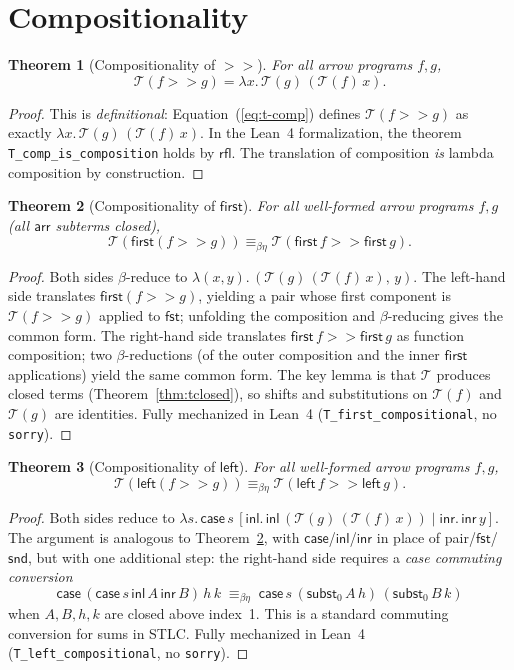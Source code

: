 \documentclass[11pt,a4paper]{article}
\newtheorem{theorem}{Theorem}
\theoremstyle{definition}
\theoremstyle{remark}
\newcommand{\comp}{\mathbin{>\!\!>}}
\newcommand{\first}{\mathsf{first}}
\newcommand{\leftc}{\mathsf{left}}
\newcommand{\T}{\mathcal{T}}
\newcommand{\beteta}{\equiv_{\beta\eta}}
\begin{document}
\section{Compositionality}\label{sec:compositionality}

\begin{theorem}[Compositionality of $\comp$]\label{thm:comp}
For all arrow programs $f, g$,
\[
  \T(f \comp g) = \lambda x.\, \T(g)\,(\T(f)\,x).
\]
\end{theorem}

\begin{proof}
This is \emph{definitional}: Equation~(\ref{eq:t-comp}) defines $\T(f \comp g)$ as
exactly $\lambda x.\, \T(g)\,(\T(f)\,x)$. In the Lean~4 formalization, the
theorem \texttt{T\_comp\_is\_composition} holds by $\mathsf{rfl}$. The
translation of composition \emph{is} lambda composition by construction.
\end{proof}

\begin{theorem}[Compositionality of $\first$]\label{thm:first}
For all well-formed arrow programs $f, g$ (all $\mathsf{arr}$ subterms
closed),
\[
  \T(\first(f \comp g)) \beteta \T(\first\,f \comp \first\,g).
\]
\end{theorem}

\begin{proof}
Both sides $\beta$-reduce to $\lambda(x, y).\, (\T(g)\,(\T(f)\,x),\, y)$.
The left-hand side translates $\first(f \comp g)$, yielding a pair whose
first component is $\T(f \comp g)$ applied to $\mathsf{fst}$; unfolding the
composition and $\beta$-reducing gives the common form. The right-hand side
translates $\first\,f \comp \first\,g$ as function composition; two
$\beta$-reductions (of the outer composition and the inner $\first$
applications) yield the same common form. The key lemma is that $\T$
produces closed terms (Theorem~\ref{thm:tclosed}), so shifts and
substitutions on $\T(f)$ and $\T(g)$ are identities. Fully mechanized in
Lean~4 (\texttt{T\_first\_compositional}, no \texttt{sorry}).
\end{proof}

\begin{theorem}[Compositionality of $\leftc$]\label{thm:left}
For all well-formed arrow programs $f, g$,
\[
  \T(\leftc(f \comp g)) \beteta \T(\leftc\,f \comp \leftc\,g).
\]
\end{theorem}

\begin{proof}
Both sides reduce to
$\lambda s.\, \mathsf{case}\,s\,[\mathsf{inl}.\, \mathsf{inl}\,(\T(g)\,(\T(f)\,x)) \mid \mathsf{inr}.\, \mathsf{inr}\,y]$.
The argument is analogous to Theorem~\ref{thm:first}, with
$\mathsf{case}$/$\mathsf{inl}$/$\mathsf{inr}$ in place of
pair/$\mathsf{fst}$/$\mathsf{snd}$, but with one additional step: the
right-hand side requires a \emph{case commuting conversion}
\[
  \mathsf{case}\,(\mathsf{case}\,s\,\mathsf{inl}\,A\,\mathsf{inr}\,B)\,h\,k
  \;\beteta\;
  \mathsf{case}\,s\,(\mathsf{subst}_0\,A\,h)\,(\mathsf{subst}_0\,B\,k)
\]
when $A, B, h, k$ are closed above index~1. This is a standard commuting
conversion for sums in STLC. Fully mechanized in Lean~4
(\texttt{T\_left\_compositional}, no \texttt{sorry}).
\end{proof}
\end{document}
